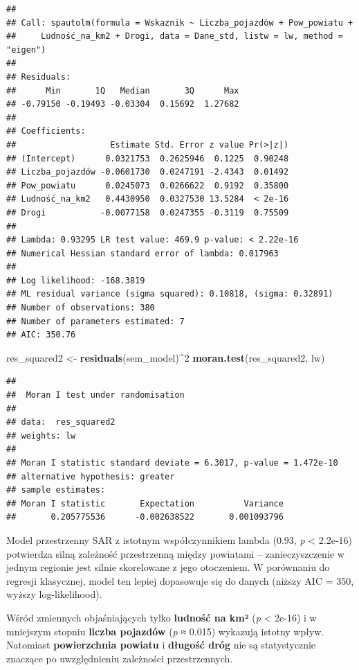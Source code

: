 \documentclass[
  11pt,
]{article}
\newenvironment{Shaded}{\begin{snugshade}}{\end{snugshade}}
\newcommand{\DecValTok}[1]{\textcolor[rgb]{0.00,0.00,0.81}{#1}}
\newcommand{\FunctionTok}[1]{\textcolor[rgb]{0.13,0.29,0.53}{\textbf{#1}}}
\newcommand{\NormalTok}[1]{#1}
\newcommand{\OtherTok}[1]{\textcolor[rgb]{0.56,0.35,0.01}{#1}}
\newcommand{\SpecialCharTok}[1]{\textcolor[rgb]{0.81,0.36,0.00}{\textbf{#1}}}
\begin{document}
\begin{verbatim}
## 
## Call: spautolm(formula = Wskaznik ~ Liczba_pojazdów + Pow_powiatu + 
##     Ludność_na_km2 + Drogi, data = Dane_std, listw = lw, method = "eigen")
## 
## Residuals:
##      Min       1Q   Median       3Q      Max 
## -0.79150 -0.19493 -0.03304  0.15692  1.27682 
## 
## Coefficients: 
##                   Estimate Std. Error z value Pr(>|z|)
## (Intercept)      0.0321753  0.2625946  0.1225  0.90248
## Liczba_pojazdów -0.0601730  0.0247191 -2.4343  0.01492
## Pow_powiatu      0.0245073  0.0266622  0.9192  0.35800
## Ludność_na_km2   0.4430950  0.0327530 13.5284  < 2e-16
## Drogi           -0.0077158  0.0247355 -0.3119  0.75509
## 
## Lambda: 0.93295 LR test value: 469.9 p-value: < 2.22e-16 
## Numerical Hessian standard error of lambda: 0.017963 
## 
## Log likelihood: -168.3819 
## ML residual variance (sigma squared): 0.10818, (sigma: 0.32891)
## Number of observations: 380 
## Number of parameters estimated: 7 
## AIC: 350.76
\end{verbatim}

\begin{Shaded}
\begin{Highlighting}[]
\NormalTok{res\_squared2 }\OtherTok{\textless{}{-}} \FunctionTok{residuals}\NormalTok{(sem\_model)}\SpecialCharTok{\^{}}\DecValTok{2}
\FunctionTok{moran.test}\NormalTok{(res\_squared2, lw)}
\end{Highlighting}
\end{Shaded}

\begin{verbatim}
## 
##  Moran I test under randomisation
## 
## data:  res_squared2  
## weights: lw    
## 
## Moran I statistic standard deviate = 6.3017, p-value = 1.472e-10
## alternative hypothesis: greater
## sample estimates:
## Moran I statistic       Expectation          Variance 
##       0.205775536      -0.002638522       0.001093796
\end{verbatim}

Model przestrzenny SAR z istotnym współczynnikiem lambda (0.93, \emph{p}
\textless{} 2.2e‑16) potwierdza silną zależność przestrzenną między
powiatami -- zanieczyszczenie w jednym regionie jest silnie skorelowane
z jego otoczeniem. W porównaniu do regresji klasycznej, model ten lepiej
dopasowuje się do danych (niższy AIC = 350, wyższy log-likelihood).

Wśród zmiennych objaśniających tylko \textbf{ludność na km²} (\emph{p}
\textless{} 2e‑16) i w mniejszym stopniu \textbf{liczba pojazdów}
(\emph{p} ≈ 0.015) wykazują istotny wpływ. Natomiast
\textbf{powierzchnia powiatu} i \textbf{długość dróg} nie są
statystycznie znaczące po uwzględnieniu zależności przestrzennych.
\end{document}
